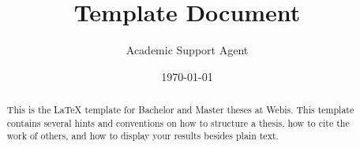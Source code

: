 \documentclass{article}
\title{Template Document}
\author{Academic Support Agent}
\date{\today}
\begin{document}
\maketitle

\begin{frontmatter}
\begin{abstract}
This is the \LaTeX{} template for Bachelor and Master theses at Webis. This template contains several hints and conventions on how to structure a thesis, how to cite the work of others, and how to display your results besides plain text. 
\end{abstract}




% 

% 


\end{frontmatter}






\end{document}

